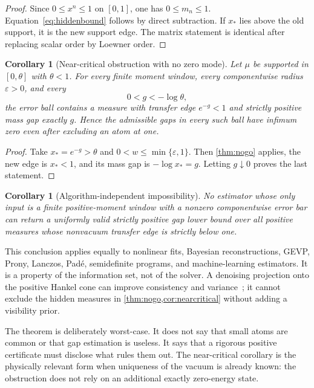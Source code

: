 \documentclass[11pt]{article}
\newtheorem{corollary}[theorem]{Corollary}
\theoremstyle{definition}
\theoremstyle{remark}
\newcommand{\eps}{\varepsilon}
\begin{document}
\begin{proof}
Since $0\leq x^n\leq1$ on $[0,1]$, one has $0\leq m_n\leq1$.
Equation~\eqref{eq:hiddenbound} follows by direct subtraction.  If $x_*$ lies
above the old support, it is the new support edge.  The matrix statement is
identical after replacing scalar order by Loewner order.
\end{proof}

\begin{corollary}[Near-critical obstruction with no zero mode]
\label{cor:nearcritical}
Let $\mu$ be supported in $[0,\theta]$ with $\theta<1$.  For every finite
moment window, every componentwise radius $\eps>0$, and every
\begin{equation}
                 0<g< -\log\theta,                    \label{eq:targetgap}
\end{equation}
the error ball contains a measure with transfer edge $e^{-g}<1$ and strictly
positive mass gap exactly $g$.  Hence the admissible gaps in every such ball
have infimum zero even after excluding an atom at one.
\end{corollary}

\begin{proof}
Take $x_*=e^{-g}>\theta$ and
$0<w\leq\min\{\eps,1\}$.  Then \cref{thm:nogo} applies, the new edge is
$x_*<1$, and its mass gap is $-\log x_*=g$.  Letting $g\downarrow0$ proves the
last statement.
\end{proof}

\begin{corollary}[Algorithm-independent impossibility]  \label{cor:algorithm}
No estimator whose only input is a finite positive-moment window with a
nonzero componentwise error bar can return a uniformly valid strictly positive
gap lower bound over all positive measures whose nonvacuum transfer edge is
strictly below one.
\end{corollary}

This conclusion applies equally to nonlinear fits, Bayesian reconstructions,
GEVP, Prony, Lanczos, Pad\'e, semidefinite programs, and machine-learning
estimators.  It is a property of the information set, not of the solver.  A
denoising projection onto the positive Hankel cone can improve consistency and
variance~\cite{Yu2024}; it cannot exclude the hidden measures in
\cref{thm:nogo,cor:nearcritical} without adding a visibility prior.

The theorem is deliberately worst-case.  It does not say that small atoms are
common or that gap estimation is useless.  It says that a rigorous positive
certificate must disclose what rules them out.  The near-critical corollary is
the physically relevant form when uniqueness of the vacuum is already known:
the obstruction does not rely on an additional exactly zero-energy state.
\end{document}
